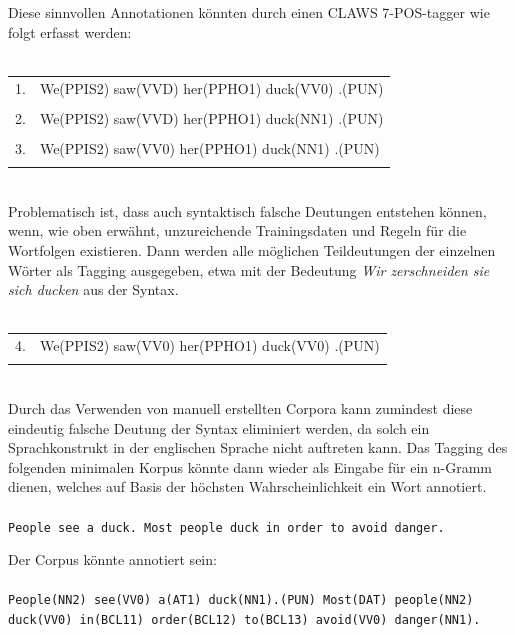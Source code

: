 \documentclass[12pt]{report}
\begin{document}
Diese sinnvollen Annotationen könnten durch einen CLAWS 7-POS-tagger wie folgt erfasst werden:
\\ \tt
\begin{tabular}{ll} 
\\
1. & We(PPIS2) saw(VVD) her(PPHO1) duck(VV0) .(PUN) \\
\\
2. & We(PPIS2) saw(VVD) her(PPHO1) duck(NN1) .(PUN) \\
\\
3. & We(PPIS2) saw(VV0) her(PPHO1) duck(NN1) .(PUN) \\
\\
\end{tabular} 
\\ \rm
Problematisch ist, dass auch syntaktisch falsche Deutungen entstehen können, wenn, wie oben erwähnt, unzureichende Trainingsdaten und Regeln für die Wortfolgen existieren. Dann werden alle möglichen Teildeutungen der einzelnen Wörter als Tagging ausgegeben, etwa mit der Bedeutung \textit{\glqq  Wir zerschneiden sie sich ducken\grqq{}} aus der Syntax.
\\ \tt
\begin{tabular}{ll} 
\\
4. & We(PPIS2) saw(VV0) her(PPHO1) duck(VV0) .(PUN)\\
\\
\end{tabular} 
\\ \rm
Durch das Verwenden von manuell erstellten Corpora kann zumindest diese eindeutig falsche Deutung der Syntax eliminiert werden, da solch ein Sprachkonstrukt in der englischen Sprache nicht auftreten kann. Das Tagging des folgenden minimalen Korpus könnte dann wieder als Eingabe für ein n-Gramm dienen, welches auf Basis der höchsten Wahrscheinlichkeit ein Wort annotiert.
\\ \tt
\\
People see a duck. Most people duck in order to avoid danger.
\rm

Der Corpus könnte annotiert sein:
\\ \tt
\\
People(NN2) see(VV0) a(AT1) duck(NN1).(PUN) Most(DAT) people(NN2) duck(VV0) in(BCL11) order(BCL12) to(BCL13) avoid(VV0) danger(NN1).
\\ \rm
\end{document}
